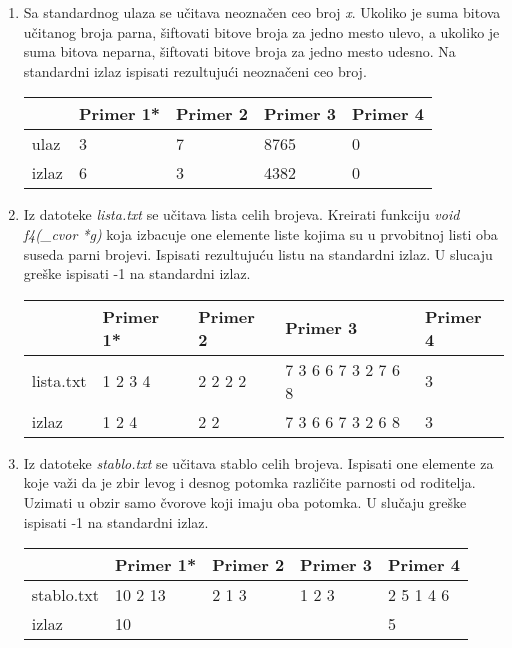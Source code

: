 \begin{enumerate}
\item Sa standardnog ulaza se u\v citava neozna\v cen ceo broj \emph{x}. Ukoliko je suma bitova u\v citanog broja parna, \v siftovati bitove broja za jedno mesto ulevo, a ukoliko je suma bitova neparna, \v siftovati bitove broja za jedno mesto udesno. Na standardni izlaz ispisati rezultuju\' ci neozna\v ceni ceo broj. 

\small
\begin{tabular}{ |l|l|l|l|l| }
\hline
  & Primer 1* &  Primer 2 &  Primer 3 &  Primer 4 \\ \hline
  ulaz & 3 & 7 &  8765
 &0\\ \hline
  izlaz & 6   & 3 &  4382 & 0\\\hline
\end{tabular}
\normalsize

\item Iz datoteke \textit{lista.txt} se u\v citava lista celih brojeva.
Kreirati funkciju \emph{void f4(\_cvor *g)} koja izbacuje one elemente liste kojima su u prvobitnoj listi oba suseda parni brojevi. Ispisati rezultuju\' cu listu na standardni izlaz.
U slucaju gre\v ske ispisati -1 na standardni izlaz.

\small
\begin{tabular}{ |l|l|l|l|l| }
\hline
  & Primer 1* &  Primer 2 &  Primer 3 &  Primer 4 \\ \hline
  lista.txt & 1 2 3 4 & 2 2 2 2 & 7 3 6 6 7 3 2 7 6 8 & 3  \\ \hline

  izlaz & 1 2 4 & 2 2 & 7 3 6 6 7 3 2 6 8 & 3 \\ \hline
\end{tabular}
\normalsize

\item Iz datoteke \textit{stablo.txt} se u\v citava stablo celih brojeva.  Ispisati one elemente za koje va\v zi da je zbir levog i desnog potomka razli\v cite parnosti od roditelja. Uzimati u obzir samo \v cvorove koji imaju oba potomka. U slu\v caju gre\v ske ispisati -1 na standardni izlaz.

\small
\begin{tabular}{ |l|l|l|l|l| }
\hline
& Primer 1* &  Primer 2 &  Primer 3 &  Primer 4 \\ \hline
  stablo.txt & 10 2 13 & 2 1 3 & 1 2 3 & 2 5 1 4 6\\ \hline

  izlaz & 10 &  &  &5\\ \hline
\end{tabular}
\normalsize

\end{enumerate}

